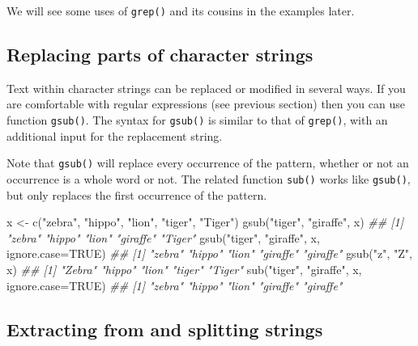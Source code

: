 \documentclass[
  13,
  letterpaper,
]{report}
\newenvironment{Shaded}{\begin{snugshade}}{\end{snugshade}}
\newcommand{\AttributeTok}[1]{\textcolor[rgb]{0.40,0.45,0.13}{#1}}
\newcommand{\ConstantTok}[1]{\textcolor[rgb]{0.56,0.35,0.01}{#1}}
\newcommand{\DocumentationTok}[1]{\textcolor[rgb]{0.37,0.37,0.37}{\textit{#1}}}
\newcommand{\FunctionTok}[1]{\textcolor[rgb]{0.28,0.35,0.67}{#1}}
\newcommand{\NormalTok}[1]{\textcolor[rgb]{0.00,0.23,0.31}{#1}}
\newcommand{\OtherTok}[1]{\textcolor[rgb]{0.00,0.23,0.31}{#1}}
\newcommand{\StringTok}[1]{\textcolor[rgb]{0.13,0.47,0.30}{#1}}
\begin{document}
We will see some uses of \texttt{grep()} and its cousins in the examples
later.

\subsection{Replacing parts of character
strings}\label{sec-05-char-replace}

Text within character strings can be replaced or modified in several
ways. If you are comfortable with regular expressions (see previous
section) then you can use function \texttt{gsub()}. The syntax for
\texttt{gsub()} is similar to that of \texttt{grep()}, with an
additional input for the replacement string.

Note that \texttt{gsub()} will replace every occurrence of the pattern,
whether or not an occurrence is a whole word or not. The related
function \texttt{sub()} works like \texttt{gsub()}, but only replaces
the first occurrence of the pattern.

\begin{Shaded}
\begin{Highlighting}[]
\NormalTok{x }\OtherTok{\textless{}{-}} \FunctionTok{c}\NormalTok{(}\StringTok{"zebra"}\NormalTok{, }\StringTok{"hippo"}\NormalTok{, }\StringTok{"lion"}\NormalTok{, }\StringTok{"tiger"}\NormalTok{, }\StringTok{"Tiger"}\NormalTok{)}
\FunctionTok{gsub}\NormalTok{(}\StringTok{"tiger"}\NormalTok{, }\StringTok{"giraffe"}\NormalTok{, x)}
\DocumentationTok{\#\# [1] "zebra"   "hippo"   "lion"    "giraffe" "Tiger"}
\FunctionTok{gsub}\NormalTok{(}\StringTok{"tiger"}\NormalTok{, }\StringTok{"giraffe"}\NormalTok{, x, }\AttributeTok{ignore.case=}\ConstantTok{TRUE}\NormalTok{)}
\DocumentationTok{\#\# [1] "zebra"   "hippo"   "lion"    "giraffe" "giraffe"}
\FunctionTok{gsub}\NormalTok{(}\StringTok{"z"}\NormalTok{, }\StringTok{"Z"}\NormalTok{, x)}
\DocumentationTok{\#\# [1] "Zebra" "hippo" "lion"  "tiger" "Tiger"}
\FunctionTok{sub}\NormalTok{(}\StringTok{"tiger"}\NormalTok{, }\StringTok{"giraffe"}\NormalTok{, x, }\AttributeTok{ignore.case=}\ConstantTok{TRUE}\NormalTok{)}
\DocumentationTok{\#\# [1] "zebra"   "hippo"   "lion"    "giraffe" "giraffe"}
\end{Highlighting}
\end{Shaded}

\subsection{Extracting from and splitting
strings}\label{sec-05-char-split}
\end{document}
